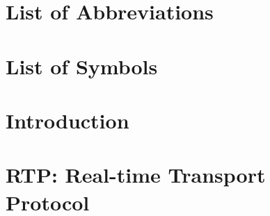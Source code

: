 \documentclass[dissertation,final]{aaltoseries} %
\begin{document}

\tableofcontents

\publicationpunctuation[]{,}{}{,}{,}{,}{}
\publicationformatting[]{}{}{\em}{}{}{}

\listofpublications


 \listoffigures
 \listoftables


%
%


\chapter*{List of Abbreviations}


\chapter*{List of Symbols}


\chapter{Introduction}
\label{chap1}


% 

\chapter{RTP: Real-time Transport Protocol}
\label{chap:rtp}

\end{document}
